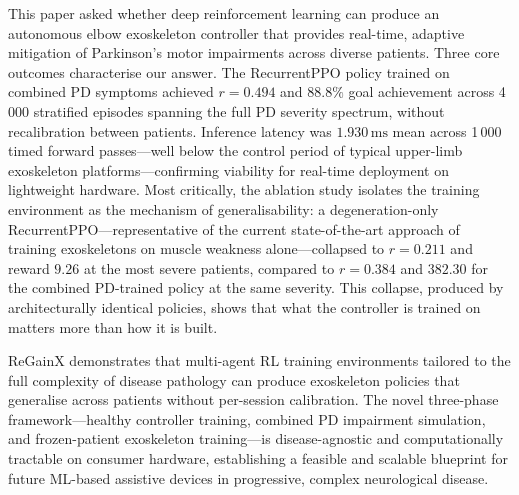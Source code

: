 \documentclass{article}
\begin{document}
This paper asked whether deep reinforcement learning can produce an
autonomous elbow exoskeleton controller that provides real-time, adaptive
mitigation of Parkinson's motor impairments across diverse patients.
Three core outcomes characterise our answer. The RecurrentPPO policy
trained on combined PD symptoms achieved $r{=}0.494$ and $88.8\%$ goal
achievement across 4\,000 stratified episodes spanning the full PD
severity spectrum, without recalibration between patients. Inference
latency was $1.930\,\mathrm{ms}$ mean across 1\,000 timed forward
passes---well below the control period of typical upper-limb exoskeleton
platforms---confirming viability for real-time deployment on lightweight
hardware. Most critically, the ablation study isolates the training
environment as the mechanism of generalisability: a degeneration-only
RecurrentPPO---representative of the current state-of-the-art approach
of training exoskeletons on muscle weakness alone---collapsed to
$r{=}0.211$ and reward $9.26$ at the most severe patients, compared to
$r{=}0.384$ and $382.30$ for the combined PD-trained policy at the same
severity. This collapse, produced by architecturally identical
policies, shows that what the controller is trained on matters more than
how it is built.

ReGainX demonstrates that multi-agent RL training environments tailored
to the full complexity of disease pathology can produce exoskeleton
policies that generalise across patients without per-session calibration.
The novel three-phase framework---healthy controller training, combined PD
impairment simulation, and frozen-patient exoskeleton training---is
disease-agnostic and computationally tractable on consumer hardware,
establishing a feasible and scalable blueprint for future ML-based
assistive devices in progressive, complex neurological disease.


\end{document}
